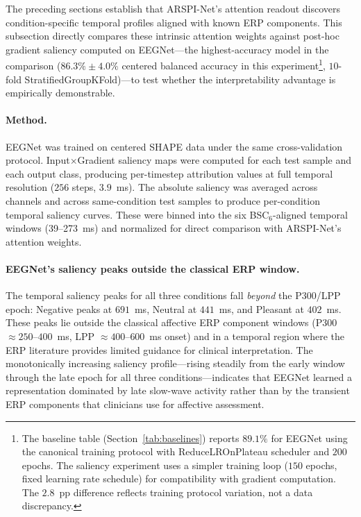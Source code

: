 The preceding sections establish that ARSPI-Net's attention readout discovers condition-specific temporal profiles aligned with known ERP components. This subsection directly compares these intrinsic attention weights against post-hoc gradient saliency computed on EEGNet---the highest-accuracy model in the comparison ($86.3\% \pm 4.0\%$ centered balanced accuracy in this experiment\footnote{The baseline table (Section~\ref{tab:baselines}) reports $89.1\%$ for EEGNet using the canonical training protocol with ReduceLROnPlateau scheduler and $200$ epochs. The saliency experiment uses a simpler training loop ($150$ epochs, fixed learning rate schedule) for compatibility with gradient computation. The $2.8$~pp difference reflects training protocol variation, not a data discrepancy.}, $10$-fold StratifiedGroupKFold)---to test whether the interpretability advantage is empirically demonstrable.

\paragraph{Method.} EEGNet \cite{lawhern_eegnet_2018} was trained on centered SHAPE data under the same cross-validation protocol. Input$\times$Gradient saliency maps \cite{shrikumar_deeplift_2017} were computed for each test sample and each output class, producing per-timestep attribution values at full temporal resolution ($256$ steps, $3.9$~ms). The absolute saliency was averaged across channels and across same-condition test samples to produce per-condition temporal saliency curves. These were binned into the six BSC$_6$-aligned temporal windows (39--273~ms) and normalized for direct comparison with ARSPI-Net's attention weights.

\paragraph{EEGNet's saliency peaks outside the classical ERP window.} The temporal saliency peaks for all three conditions fall \emph{beyond} the P300/LPP epoch: Negative peaks at $691$~ms, Neutral at $441$~ms, and Pleasant at $402$~ms. These peaks lie outside the classical affective ERP component windows (P300 $\approx 250$--$400$~ms, LPP $\approx 400$--$600$~ms onset) and in a temporal region where the ERP literature provides limited guidance for clinical interpretation. The monotonically increasing saliency profile---rising steadily from the early window through the late epoch for all three conditions---indicates that EEGNet learned a representation dominated by late slow-wave activity rather than by the transient ERP components that clinicians use for affective assessment.

